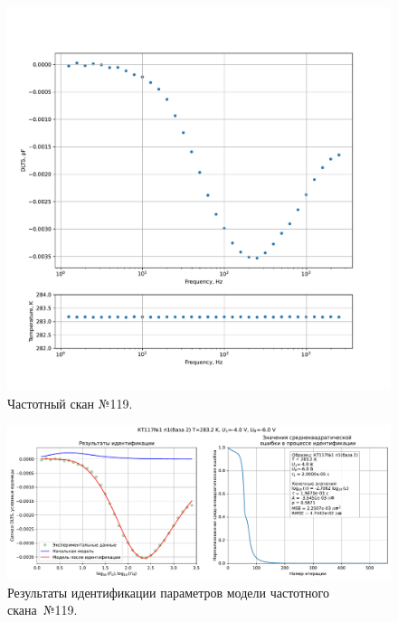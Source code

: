 \begin{figure}[!ht]
    \centering
    \includegraphics[width=1\textwidth]{../plots/КТ117№1_п1(база 2)_2500Гц-1Гц_1пФ_+10С_-4В-6В_50мВ_20мкс_шаг_0,1.pdf}
    \caption{Частотный скан №119.}
    \label{pic:frequency_scan_119}
\end{figure}

\begin{figure}[!ht]
    \centering
    \includegraphics[width=1\textwidth]{../plots/КТ117№1_п1(база 2)_2500Гц-1Гц_1пФ_+10С_-4В-6В_50мВ_20мкс_шаг_0,1_model.pdf}
    \caption{Результаты идентификации параметров модели частотного скана~№119.}
    \label{pic:frequency_scan_model119}
\end{figure}

\pagebreak


